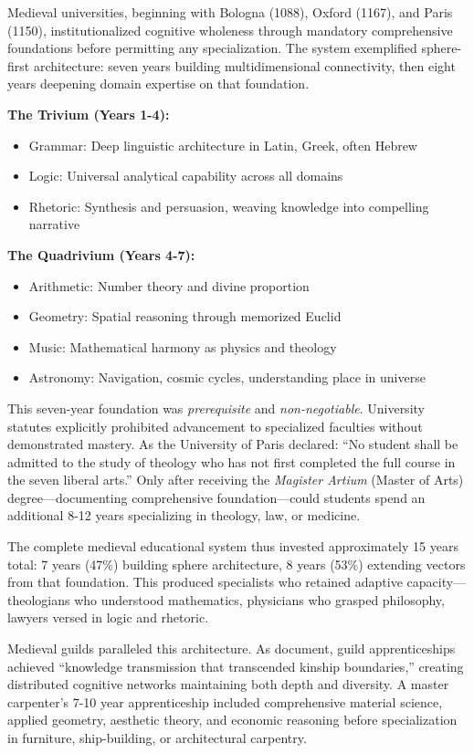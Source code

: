 Medieval universities, beginning with Bologna (1088), Oxford (1167), and Paris (1150), institutionalized cognitive wholeness through mandatory comprehensive foundations before permitting any specialization. The system exemplified sphere-first architecture: seven years building multidimensional connectivity, then eight years deepening domain expertise on that foundation.

\textbf{The Trivium (Years 1-4):}
\begin{itemize}
\item Grammar: Deep linguistic architecture in Latin, Greek, often Hebrew
\item Logic: Universal analytical capability across all domains
\item Rhetoric: Synthesis and persuasion, weaving knowledge into compelling narrative
\end{itemize}

\textbf{The Quadrivium (Years 4-7):}
\begin{itemize}
\item Arithmetic: Number theory and divine proportion
\item Geometry: Spatial reasoning through memorized Euclid
\item Music: Mathematical harmony as physics and theology
\item Astronomy: Navigation, cosmic cycles, understanding place in universe
\end{itemize}

This seven-year foundation was \textit{prerequisite} and \textit{non-negotiable}. University statutes explicitly prohibited advancement to specialized faculties without demonstrated mastery. As the University of Paris declared: ``No student shall be admitted to the study of theology who has not first completed the full course in the seven liberal arts.'' Only after receiving the \textit{Magister Artium} (Master of Arts) degree—documenting comprehensive foundation—could students spend an additional 8-12 years specializing in theology, law, or medicine.

The complete medieval educational system thus invested approximately 15 years total: 7 years (47\%) building sphere architecture, 8 years (53\%) extending vectors from that foundation. This produced specialists who retained adaptive capacity—theologians who understood mathematics, physicians who grasped philosophy, lawyers versed in logic and rhetoric.

Medieval guilds paralleled this architecture. As \citet{delacroix2018} document, guild apprenticeships achieved ``knowledge transmission that transcended kinship boundaries,'' creating distributed cognitive networks maintaining both depth and diversity. A master carpenter's 7-10 year apprenticeship included comprehensive material science, applied geometry, aesthetic theory, and economic reasoning before specialization in furniture, ship-building, or architectural carpentry.

